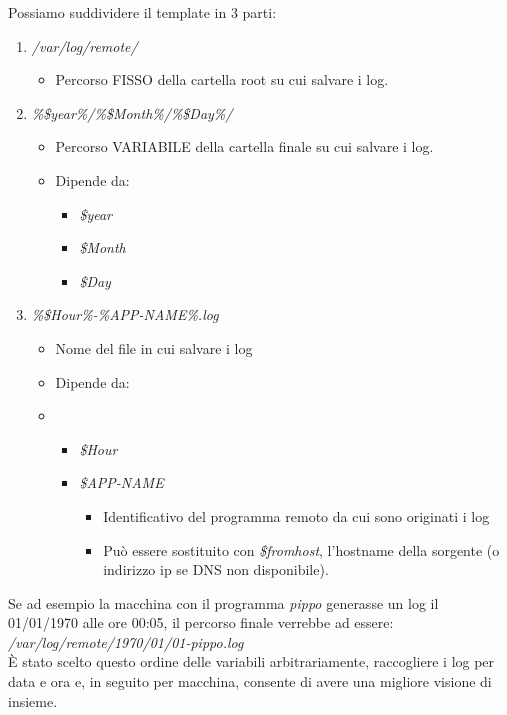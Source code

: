 \documentclass[../DocumentazioneProgetto.tex]{subfiles}
\begin{document}
Possiamo suddividere il template in 3 parti:
\begin{enumerate}
	\item \textit{/var/log/remote/}
	\begin{itemize}
		\item Percorso FISSO della cartella root su cui salvare i log.
	\end{itemize}
	\item \textit{\%\$year\%/\%\$Month\%/\%\$Day\%/}
	\begin{itemize}
		\item Percorso VARIABILE della cartella finale su cui salvare i log.
		\item Dipende da:
		\begin{itemize}
			\item \textit{\$year}
			\item \textit{\$Month}
			\item \textit{\$Day}
		\end{itemize}
	\end{itemize}
	\item \textit{\%\$Hour\%-\%APP-NAME\%.log}
	\begin{itemize}
		\item Nome del file in cui salvare i log
		\item Dipende da:
		\item \begin{itemize}
			\item \textit{\$Hour}
			\item \textit{\$APP-NAME}
			\begin{itemize}
				\item Identificativo del programma remoto da cui sono originati i log
				\item Può essere sostituito con \textit{\$fromhost}, l'hostname della sorgente (o indirizzo ip se DNS non disponibile).
			\end{itemize}
		\end{itemize}
	\end{itemize}
\end{enumerate}
Se ad esempio la macchina con il programma \textit{pippo} generasse un log il 01/01/1970 alle ore 00:05, il percorso finale verrebbe ad essere:\\
\textit{\textit{/var/log/remote/1970/01/01-pippo.log}}\\
È stato scelto questo ordine delle variabili arbitrariamente, raccogliere i log per data e ora e, in seguito per macchina, consente di avere una migliore visione di insieme.\\
\end{document}
